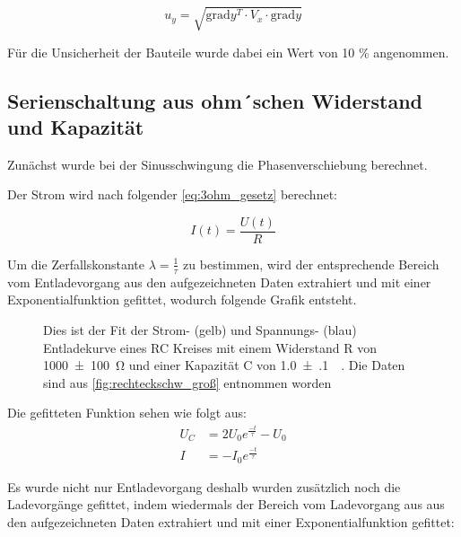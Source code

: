 \documentclass[11pt,ngerman]{scrartcl}
\begin{document}
\begin{equation}
	\label{eq:graduncentainty}
	u_y = \sqrt{\mathrm{grad} y^T \cdot V_x \cdot \mathrm{grad} y}
\end{equation}

Für die Unsicherheit der Bauteile wurde dabei ein Wert von 10 \% angenommen.

\subsection{Serienschaltung aus ohm´schen Widerstand und Kapazität}

Zunächst wurde bei der Sinusschwingung die Phasenverschiebung berechnet.

Der Strom wird nach folgender \autoref{eq:3ohm_gesetz} berechnet:

\begin{equation}
	\label{eq:3ohm_gesetz}
	I(t) = \frac{U(t)}{R}
\end{equation}

Um die Zerfallskonstante $\lambda = \frac{1}{\tau}$ zu bestimmen, wird der
entsprechende Bereich vom Entladevorgang aus den aufgezeichneten Daten
extrahiert und mit einer Exponentialfunktion gefittet, wodurch folgende Grafik
entsteht.

\begin{figure}
	\begin{center}
	\end{center}
	\caption{Dies ist der Fit der Strom- (gelb) und Spannungs- (blau) Entladekurve eines RC Kreises mit einem
		Widerstand R von \SI{1000(100)}{\ohm} und einer Kapazität C von
		\SI{1.0(1)}{\micro\Farad}. Die Daten sind aus \autoref{fig:rechteckschw_groß}
		entnommen worden}
	\label{fig:entladekurve}
\end{figure}


Die gefitteten Funktion sehen wie folgt aus:
\begin{align*}
	U_C & = 2U_0 e^{\frac{-t}{\tau}} - U_0 \\
	I   & = -I_0 e^{\frac{-t}{\tau}}
\end{align*}

Es wurde nicht nur Entladevorgang deshalb wurden zusätzlich noch die
Ladevorgänge gefittet, indem wiedermals der Bereich vom Ladevorgang aus aus den
aufgezeichneten Daten extrahiert und mit einer Exponentialfunktion gefittet:
\end{document}
